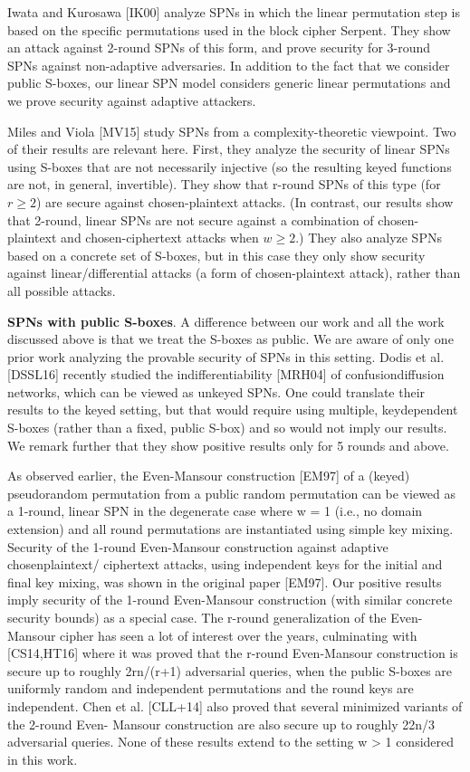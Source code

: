 Iwata and Kurosawa [IK00] analyze SPNs in which the linear permutation
step is based on the specific permutations used in the block cipher Serpent. They
show an attack against 2-round SPNs of this form, and prove security for 3-round
SPNs against non-adaptive adversaries. In addition to the fact that we consider
public S-boxes, our linear SPN model considers generic linear permutations and
we prove security against adaptive attackers.

Miles and Viola [MV15] study SPNs from a complexity-theoretic viewpoint.
Two of their results are relevant here. First, they analyze the security of linear
SPNs using S-boxes that are not necessarily injective (so the resulting keyed
functions are not, in general, invertible). They show that r-round SPNs of this
type (for $r\geq 2$) are secure against chosen-plaintext attacks. (In contrast, our
results show that 2-round, linear SPNs are not secure against a combination of
chosen-plaintext and chosen-ciphertext attacks when $w\geq 2$.) They also analyze
SPNs based on a concrete set of S-boxes, but in this case they only show security
against linear/differential attacks (a form of chosen-plaintext attack), rather
than all possible attacks.


{\bf SPNs with public S-boxes}. A difference between our work and all the work
discussed above is that we treat the S-boxes as public. We are aware of only
one prior work analyzing the provable security of SPNs in this setting. Dodis
et al. [DSSL16] recently studied the indifferentiability [MRH04] of confusiondiffusion
networks, which can be viewed as unkeyed SPNs. One could translate
their results to the keyed setting, but that would require using multiple, keydependent
S-boxes (rather than a fixed, public S-box) and so would not imply
our results. We remark further that they show positive results only for 5 rounds
and above.


As observed earlier, the Even-Mansour construction [EM97] of a (keyed)
pseudorandom permutation from a public random permutation can be viewed
as a 1-round, linear SPN in the degenerate case where w = 1 (i.e., no domain
extension) and all round permutations are instantiated using simple key mixing.
Security of the 1-round Even-Mansour construction against adaptive chosenplaintext/
ciphertext attacks, using independent keys for the initial and final key mixing, was shown in the original paper [EM97]. Our positive results imply
security of the 1-round Even-Mansour construction (with similar concrete security
bounds) as a special case. The r-round generalization of the Even-Mansour
cipher has seen a lot of interest over the years, culminating with [CS14,HT16]
where it was proved that the r-round Even-Mansour construction is secure up to
roughly 2rn/(r+1) adversarial queries, when the public S-boxes are uniformly random
and independent permutations and the round keys are independent. Chen et
al. [CLL+14] also proved that several minimized variants of the 2-round Even-
Mansour construction are also secure up to roughly 22n/3 adversarial queries.
None of these results extend to the setting w > 1 considered in this work.





